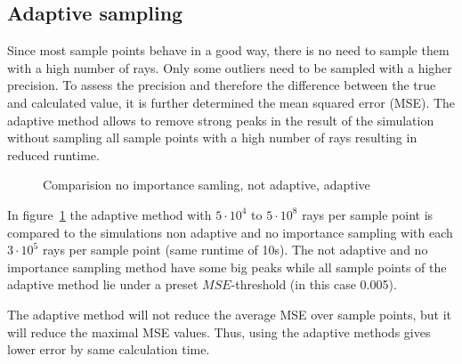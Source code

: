 \subsection{Adaptive sampling}
Since most sample points behave in a good way, there is no need
to sample them with a high number of rays. Only some outliers need to
be sampled with a higher precision. To assess the precision
and therefore the difference between the true and calculated value,
it is further determined the mean squared error (MSE).
The adaptive method allows to remove strong peaks in the result
of the simulation without sampling all sample points with
a high number of rays resulting in reduced runtime.
\begin{figure}
  \centerline{
    }
  \caption{Comparision no importance samling, not adaptive, adaptive}
  \label{plot:adaptive}
\end{figure}

In figure~\ref{plot:adaptive} the adaptive method with 
$5 \cdot 10^4$ to $5 \cdot 10^8$ rays per sample point is compared to the simulations
non adaptive and no importance sampling with each $3 \cdot 10^5$ rays per sample point (same runtime of 10s).
The not adaptive and no importance sampling method have some big peaks while all sample points of 
the adaptive method lie under a preset $MSE$-threshold (in this case 0.005). 

The adaptive method will not reduce the average MSE over sample points,
but it will reduce the maximal MSE values. Thus, using the adaptive
methods gives lower error by same calculation time.


